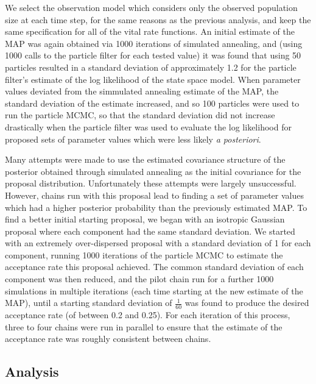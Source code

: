 \documentclass[a4paper,12pt]{article}
\begin{document}
We select the observation model which considers only the observed population size at each time step, for the same reasons as the previous analysis, and keep the same specification for all of the vital rate functions. An initial estimate of the MAP was again obtained via 1000 iterations of simulated annealing, and (using 1000 calls to the particle filter for each tested value) it was found that using 50 particles resulted in a standard deviation of approximately 1.2 for the particle filter's estimate of the log likelihood of the state space model. When parameter values deviated from the simmulated annealing estimate of the MAP, the standard deviation of the estimate increased, and so 100 particles were used to run the particle MCMC, so that the standard deviation did not increase drastically when the particle filter was used to evaluate the log likelihood for proposed sets of parameter values which were less likely \textit{a posteriori}. 

Many attempts were made to use the estimated covariance structure of the posterior obtained through simulated annealing as the initial covariance for the proposal distribution. Unfortunately these attempts were largely unsuccessful. However, chains run with this proposal lead to finding a set of parameter values which had a higher posterior probability than the previously estimated MAP. To find a better initial starting proposal, we began with an isotropic Gaussian proposal where each component had the same standard deviation. We started with an extremely over-dispersed proposal with a standard deviation of 1 for each component, running 1000 iterations of the particle MCMC to estimate the acceptance rate this proposal achieved. The common standard deviation of each component was then reduced, and the pilot chain run for a further 1000 simulations in multiple iterations (each time starting at the new estimate of the MAP), until a starting standard deviation of $\frac{1}{60}$ was found to produce the desired acceptance rate (of between 0.2 and 0.25). For each iteration of this process, three to four chains were run in parallel to ensure that the estimate of the acceptance rate was roughly consistent between chains.

\subsection{Analysis}
\end{document}
